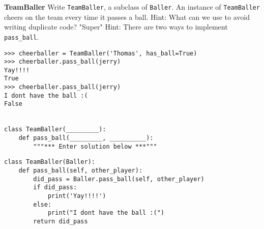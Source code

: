 \question \textbf{TeamBaller} \newline
Write \texttt{TeamBaller}, a subclass of \texttt{Baller}. An instance of
\texttt{TeamBaller} cheers on the team every time it passes a ball.  \newline
Hint: What can we use to avoid writing duplicate code? \newline
"Super" Hint: There are two ways to implement \texttt{pass\_ball}. \newline

\begin{lstlisting}
>>> cheerballer = TeamBaller('Thomas', has_ball=True)
>>> cheerballer.pass_ball(jerry)
Yay!!!!
True
>>> cheerballer.pass_ball(jerry)
I dont have the ball :(
False


class TeamBaller(_________):
    def pass_ball(_________, __________):
        """*** Enter solution below ***"""
\end{lstlisting}
\begin{solution}[0in]
\begin{lstlisting}
class TeamBaller(Baller):
    def pass_ball(self, other_player):
        did_pass = Baller.pass_ball(self, other_player)
        if did_pass:
            print('Yay!!!!')
        else:
            print("I dont have the ball :(")
        return did_pass
\end{lstlisting}
\end{solution}
